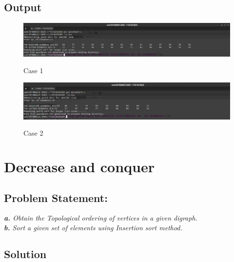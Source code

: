 \documentclass[12pt, a4paper]{article}
\begin{document}
\subsection*{Output}
\begin{figure}[h]
\centering
\includegraphics[width=5.3 in,height=2.5 in]{./Output/im3.png}
\label{Figure 2}
\caption{Case 1}
\end{figure}
\begin{figure}[h]
\centering
\includegraphics[width=5.3 in,height=2.5 in]{./Output/im4.png}
\label{Figure 3}
\caption{Case 2}
\end{figure}
\newpage
\section{Decrease and conquer}\subsection*{Problem Statement:}\par\textit{\textbf{a.} Obtain the Topological ordering of vertices in a given digraph.\\
\textbf{b.} Sort a given set of elements using Insertion sort method.}
\subsection*{Solution}
\end{document}
